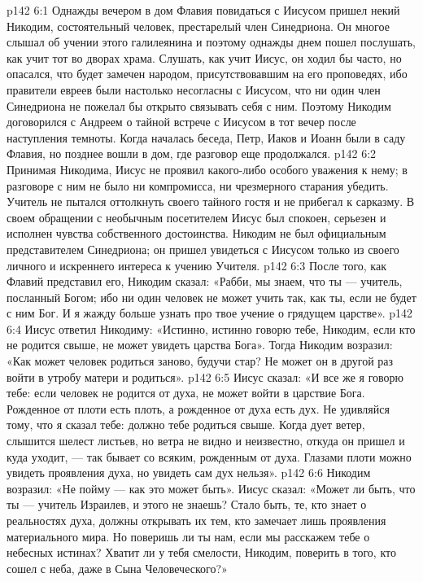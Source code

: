 \vs p142 6:1 Однажды вечером в дом Флавия повидаться с Иисусом пришел некий Никодим, состоятельный человек, престарелый член Синедриона. Он многое слышал об учении этого галилеянина и поэтому однажды днем пошел послушать, как учит тот во дворах храма. Слушать, как учит Иисус, он ходил бы часто, но опасался, что будет замечен народом, присутствовавшим на его проповедях, ибо правители евреев были настолько несогласны с Иисусом, что ни один член Синедриона не пожелал бы открыто связывать себя с ним. Поэтому Никодим договорился с Андреем о тайной встрече с Иисусом в тот вечер после наступления темноты. Когда началась беседа, Петр, Иаков и Иоанн были в саду Флавия, но позднее вошли в дом, где разговор еще продолжался.
\vs p142 6:2 Принимая Никодима, Иисус не проявил какого\hyp{}либо особого уважения к нему; в разговоре с ним не было ни компромисса, ни чрезмерного старания убедить. Учитель не пытался оттолкнуть своего тайного гостя и не прибегал к сарказму. В своем обращении с необычным посетителем Иисус был спокоен, серьезен и исполнен чувства собственного достоинства. Никодим не был официальным представителем Синедриона; он пришел увидеться с Иисусом только из своего личного и искреннего интереса к учению Учителя.
\vs p142 6:3 После того, как Флавий представил его, Никодим сказал: «Рабби, мы знаем, что ты --- учитель, посланный Богом; ибо ни один человек не может учить так, как ты, если не будет с ним Бог. И я жажду больше узнать про твое учение о грядущем царстве».
\vs p142 6:4 Иисус ответил Никодиму: «Истинно, истинно говорю тебе, Никодим, если кто не родится свыше, не может увидеть царства Бога». Тогда Никодим возразил: «Как может человек родиться заново, будучи стар? Не может он в другой раз войти в утробу матери и родиться».
\vs p142 6:5 Иисус сказал: «И все же я говорю тебе: если человек не родится от духа, не может войти в царствие Бога. Рожденное от плоти есть плоть, а рожденное от духа есть дух. Не удивляйся тому, что я сказал тебе: должно тебе родиться свыше. Когда дует ветер, слышится шелест листьев, но ветра не видно и неизвестно, откуда он пришел и куда уходит, --- так бывает со всяким, рожденным от духа. Глазами плоти можно увидеть проявления духа, но увидеть сам дух нельзя».
\vs p142 6:6 Никодим возразил: «Не пойму --- как это может быть». Иисус сказал: «Может ли быть, что ты --- учитель Израилев, и этого не знаешь? Стало быть, те, кто знает о реальностях духа, должны открывать их тем, кто замечает лишь проявления материального мира. Но поверишь ли ты нам, если мы расскажем тебе о небесных истинах? Хватит ли у тебя смелости, Никодим, поверить в того, кто сошел с неба, даже в Сына Человеческого?»
